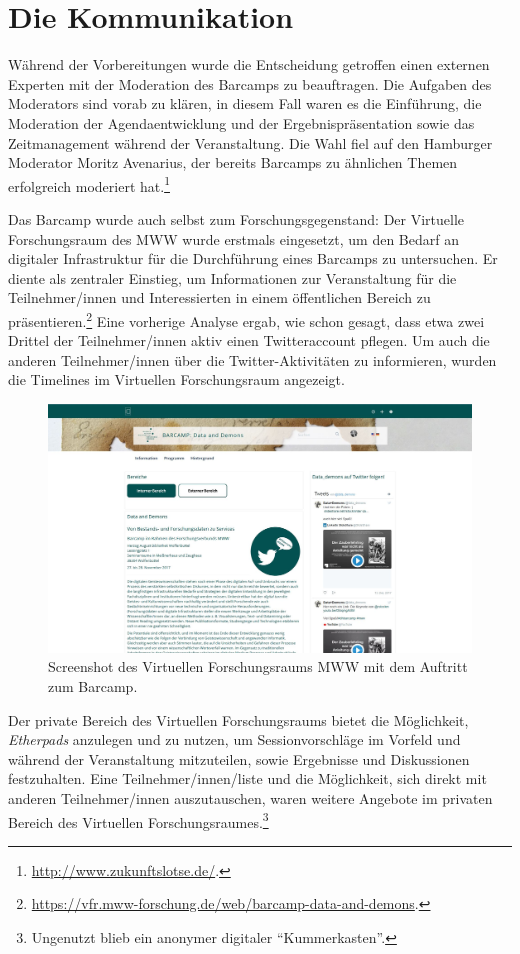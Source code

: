 \documentclass[a4paper,
fontsize=11pt,
oneside,
numbers=noperiodatend,
parskip=half-,
bibliography=totoc,
final
]{scrartcl}
\begin{document}
\hypertarget{die-kommunikation}{%
\section{Die Kommunikation}\label{die-kommunikation}}

Während der Vorbereitungen wurde die Entscheidung getroffen einen
externen Experten mit der Moderation des Barcamps zu beauftragen. Die
Aufgaben des Moderators sind vorab zu klären, in diesem Fall waren es
die Einführung, die Moderation der Agendaentwicklung und der
Ergebnispräsentation sowie das Zeitmanagement während der Veranstaltung.
Die Wahl fiel auf den Hamburger Moderator Moritz Avenarius, der bereits
Barcamps zu ähnlichen Themen erfolgreich moderiert hat.\footnote{\url{http://www.zukunftslotse.de/}.}

Das Barcamp wurde auch selbst zum Forschungsgegenstand: Der Virtuelle
Forschungsraum des MWW wurde erstmals eingesetzt, um den Bedarf an
digitaler Infrastruktur für die Durchführung eines Barcamps zu
untersuchen. Er diente als zentraler Einstieg, um Informationen zur
Veranstaltung für die Teilnehmer/innen und Interessierten in einem
öffentlichen Bereich zu präsentieren.\footnote{\url{https://vfr.mww-forschung.de/web/barcamp-data-and-demons}.}
Eine vorherige Analyse ergab, wie schon gesagt, dass etwa zwei Drittel
der Teilnehmer/innen aktiv einen Twitteraccount pflegen. Um auch die
anderen Teilnehmer/innen über die Twitter-Aktivitäten zu informieren,
wurden die Timelines im Virtuellen Forschungsraum angezeigt.

\begin{figure}
\centering
\includegraphics[width=0.7\columnwidth]{img/Abbildung1.jpg}
\caption{Screenshot des Virtuellen Forschungsraums MWW mit dem Auftritt
zum Barcamp.}
\end{figure}

Der private Bereich des Virtuellen Forschungsraums bietet die
Möglichkeit, \emph{Etherpads} anzulegen und zu nutzen, um
Sessionvorschläge im Vorfeld und während der Veranstaltung mitzuteilen,
sowie Ergebnisse und Diskussionen festzuhalten. Eine
Teilnehmer/innen/liste und die Möglichkeit, sich direkt mit anderen
Teilnehmer/innen auszutauschen, waren weitere Angebote im privaten
Bereich des Virtuellen Forschungsraumes.\footnote{Ungenutzt blieb ein
  anonymer digitaler \enquote{Kummerkasten}.}
\end{document}
